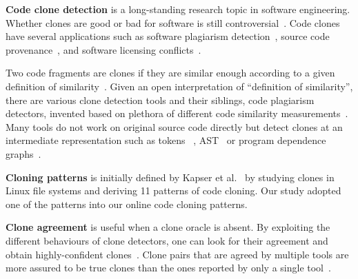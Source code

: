 \documentclass[10pt,journal,compsoc]{IEEEtran}
\begin{document}
\textbf{Code clone detection} is a long-standing research topic in
software engineering. Whether clones are good or bad for software is
still
controversial~\cite{Sajnani2016,Kapser2003,Kapser2008,Krinke2008,Hotta2010,Gode2011,Harder2013}.
Code clones have several
applications such as software plagiarism
detection~\cite{Prechelt2002}, source code
provenance~\cite{Davies2013}, and software licensing
conflicts~\cite{German2009}.

Two code fragments are clones if they are similar enough according to
a given definition of similarity~\cite{Bellon2007}. Given an open
interpretation of ``definition of similarity'', there are various
clone detection tools and their siblings, code plagiarism detectors,
invented based on plethora of different code similarity
measurements~\cite{Roy2008, Ragkhitwetsagul2016,Svajlenko2014}. 
Many tools do not work on original source code directly but detect clones
at an intermediate representation such as tokens ~\cite{Sajnani2016,Kamiya2002,Li2006,Gode2009,Burrows2007, Smith2009, Duric2012, Prechelt2002, Schleimer2003}, AST~\cite{Baxter1998,Jiang2007a} or program dependence
graphs~\cite{Krinke2001,Komondoor2001}. 

\textbf{Cloning patterns} is initially defined 
by Kapser et al.~\cite{Kapser2003,Kapser2008} by studying clones in 
Linux file systems and deriving 11 patterns of code cloning. 
Our study adopted one of the patterns into our online code cloning patterns.

\textbf{Clone agreement} is useful when a clone oracle is
absent. %
By exploiting the different behaviours of clone detectors,
one can look for their agreement and obtain
highly-confident clones~\cite{Bellon2007,Wang2013}. %
Clone pairs that are agreed by multiple tools are more assured to be true
clones than the ones reported by only a single
tool~\cite{Wang2013,cr2016ssbse,Funaro2010}. 
\end{document}
